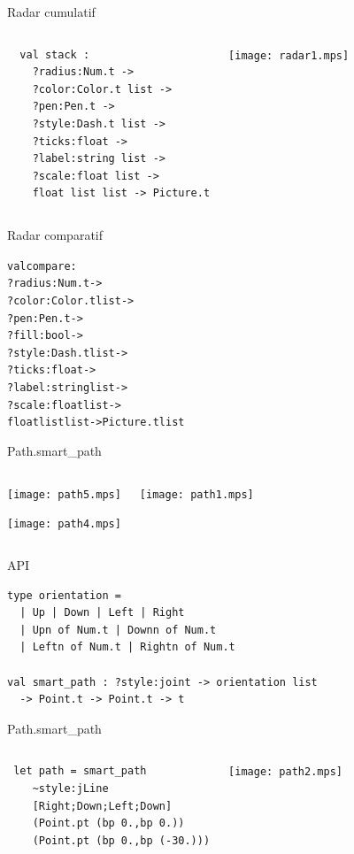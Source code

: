 \documentclass{beamer}
\begin{document}
\begin{frame}[fragile]{Radar cumulatif}
  \begin{columns}
\begin{verbatim}
  val stack :
    ?radius:Num.t ->
    ?color:Color.t list ->
    ?pen:Pen.t ->
    ?style:Dash.t list ->
    ?ticks:float ->
    ?label:string list ->
    ?scale:float list ->
    float list list -> Picture.t
\end{verbatim}
    \texttt{[image: radar1.mps]}
  \end{columns}
\end{frame}


\begin{frame}[fragile]{Radar comparatif}
\begin{alltt}
  val compare :
    ?radius:Num.t ->
    ?color:Color.t list ->
    ?pen:Pen.t ->
    \color{red}?fill:bool ->
\color{black}    ?style:Dash.t list ->
    ?ticks:float ->
    ?label:string list ->
    ?scale:float list ->
    float list list -> Picture.t \color{red}list
\end{alltt}
\end{frame}


\begin{frame}[fragile]{Path.smart\_path}
  \begin{columns}
    
    \bigskip
    \bigskip
    \begin{center}
    \texttt{[image: path5.mps]}
    \bigskip
    
    \texttt{[image: path4.mps]}
  \end{center}
    \texttt{[image: path1.mps]}
  \end{columns}
\end{frame}


\begin{frame}[fragile]{API}
\begin{verbatim}
type orientation = 
  | Up | Down | Left | Right
  | Upn of Num.t | Downn of Num.t 
  | Leftn of Num.t | Rightn of Num.t
  
val smart_path : ?style:joint -> orientation list 
  -> Point.t -> Point.t -> t
\end{verbatim}
\end{frame}


\begin{frame}[fragile]{Path.smart\_path}
  \begin{columns}
\begin{verbatim}
 let path = smart_path 
    ~style:jLine
    [Right;Down;Left;Down]
    (Point.pt (bp 0.,bp 0.)) 
    (Point.pt (bp 0.,bp (-30.)))
\end{verbatim}
    \texttt{[image: path2.mps]}
\end{columns}
\end{frame}
\end{document}
